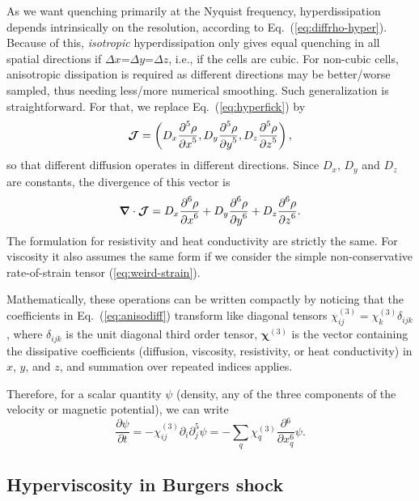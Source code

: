 \documentclass[\mydriver,12pt,twoside,notitlepage,a4paper]{article}
\renewcommand{\vec}[1]{\mbox{\boldmath{$#1$}}}
\newcommand{\Div}     {\vec{\nabla}\cdot}
\newcommand{\pderiv}[2]{\frac{\partial #1}{\partial #2}}
\newcommand{\pderivn}[3]{\frac{{\partial{}}^{#3} #1}{{\partial #2}^{#3}}}
\begin{document}
As we want quenching primarily at the Nyquist frequency, hyperdissipation
depends intrinsically on the resolution, according to
Eq.~(\ref{eq:diffrho-hyper}).
Because of this, {\it isotropic} hyperdissipation only gives equal
quenching in all spatial directions if $\Delta x$=$\Delta y$=$\Delta z$,
i.e., if the cells are cubic.
For non-cubic cells, anisotropic dissipation is required as different
directions may be better/worse sampled, thus needing less/more numerical
smoothing.
Such generalization is straightforward. For that, we replace
Eq.~(\ref{eq:hyperfick}) by
\begin{equation}
  \label{eq:general-fick}
  \vec{\mathcal J}
    = \left(
        D_x \pderivn{\rho}{x}{5},
        D_y \pderivn{\rho}{y}{5},
        D_z \pderivn{\rho}{z}{5}
      \right),
\end{equation}
so that different diffusion operates in different directions.
Since $D_x$, $D_y$ and $D_z$ are constants, the divergence of this vector
is
\begin{equation}
  \label{eq:anisodiff}
  \Div\vec{\mathcal J}=D_x \pderivn{\rho}{x}{6}+
  D_y \pderivn{\rho}{y}{6}+
  D_z \pderivn{\rho}{z}{6}.
\end{equation}
The formulation for resistivity and heat conductivity are strictly the
same.
For viscosity it also assumes the same form if we consider the simple
non-conservative rate-of-strain tensor (\ref{eq:weird-strain}).

Mathematically, these operations can be written compactly by noticing that
the coefficients in Eq.~(\ref{eq:anisodiff}) transform like diagonal
tensors $\chi_{ij}^{(3)}=\chi_k^{(3)} \delta_{ijk}$, where $\delta_{ijk}$
is the unit diagonal third order tensor, $\mathbf{\chi}^{(3)}$ is the
vector containing the dissipative coefficients (diffusion, viscosity,
resistivity, or heat conductivity) in $x$, $y$, and $z$, and summation
over repeated indices applies.

Therefore, for a scalar quantity $\psi$ (density, any of the three components
of the velocity or magnetic potential), we can write
\begin{equation}
  \label{eq:component-6th}
  \pderiv{\psi}{t}
  = - \chi_{ij}^{(3)} {\partial{}}_i{\partial{}}_j^5\psi
  = -\sum_{q}^{} {\chi_q^{(3)} \frac{\partial{}^6}{\partial{x_q^6}}\psi}.
\end{equation}

\subsection{Hyperviscosity in Burgers shock}
\end{document}
